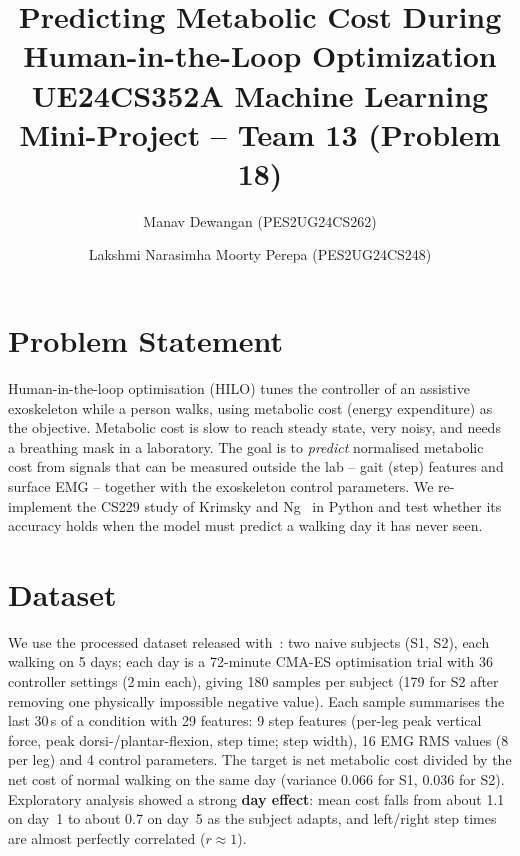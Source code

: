 \documentclass[10pt,twocolumn]{article}
\title{\vspace{-1.2cm}\textbf{Predicting Metabolic Cost During Human-in-the-Loop Optimization}\\
\large UE24CS352A Machine Learning Mini-Project -- Team 13 (Problem 18)}
\author{Manav Dewangan (PES2UG24CS262) \and Lakshmi Narasimha Moorty Perepa (PES2UG24CS248)}
\date{}
\begin{document}
\maketitle
\vspace{-1cm}

\section{Problem Statement}
Human-in-the-loop optimisation (HILO) tunes the controller of an assistive exoskeleton while a
person walks, using metabolic cost (energy expenditure) as the objective. Metabolic cost is slow to
reach steady state, very noisy, and needs a breathing mask in a laboratory. The goal is to
\emph{predict} normalised metabolic cost from signals that can be measured outside the lab --
gait (step) features and surface EMG -- together with the exoskeleton control parameters. We
re-implement the CS229 study of Krimsky and Ng~\cite{krimsky} in Python and test whether its
accuracy holds when the model must predict a walking day it has never seen.

\section{Dataset}
We use the processed dataset released with~\cite{krimsky}: two naive subjects (S1, S2), each
walking on 5 days; each day is a 72-minute CMA-ES optimisation trial with 36 controller settings
(2\,min each), giving 180 samples per subject (179 for S2 after removing one physically
impossible negative value). Each sample summarises the last 30\,s of a condition with 29 features:
9 step features (per-leg peak vertical force, peak dorsi-/plantar-flexion, step time; step width),
16 EMG RMS values (8 per leg) and 4 control parameters. The target is net metabolic cost divided
by the net cost of normal walking on the same day (variance 0.066 for S1, 0.036 for S2).
Exploratory analysis showed a strong \textbf{day effect}: mean cost falls from about 1.1 on day~1 to
about 0.7 on day~5 as the subject adapts, and left/right step times are almost perfectly
correlated ($r\approx1$).
\end{document}
